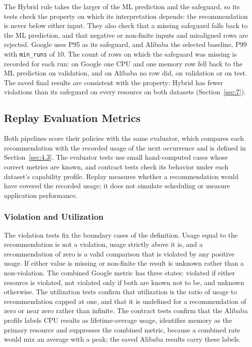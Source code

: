 \documentclass{IEEEtran}
\begin{document}
The Hybrid rule takes the larger of the ML prediction and the safeguard, so its tests check the property on which its interpretation depends: the recommendation is never below either input. They also check that a missing safeguard falls back to the ML prediction, and that negative or non-finite inputs and misaligned rows are rejected. Google uses P95 as its safeguard, and Alibaba the selected baseline, P99 with \texttt{min\_runs} of 10. The count of rows on which the safeguard was missing is recorded for each run: on Google one CPU and one memory row fell back to the ML prediction on validation, and on Alibaba no row did, on validation or on test. The saved final results are consistent with the property: Hybrid has fewer violations than its safeguard on every resource on both datasets (Section~\ref{sec:7}).

\subsection{Replay Evaluation Metrics}\label{sec:6.4}

Both pipelines score their policies with the same evaluator, which compares each recommendation with the recorded usage of the next occurrence and is defined in Section~\ref{sec:4.3}. The evaluator tests use small hand-computed cases whose correct metrics are known, and contract tests check its behavior under each dataset's capability profile. Replay measures whether a recommendation would have covered the recorded usage; it does not simulate scheduling or measure application performance.

\subsubsection{Violation and Utilization}\label{sec:6.4.1}

The violation tests fix the boundary cases of the definition. Usage equal to the recommendation is not a violation, usage strictly above it is, and a recommendation of zero is a valid comparison that is violated by any positive usage. If either value is missing or non-finite the result is unknown rather than a non-violation. The combined Google metric has three states: violated if either resource is violated, not violated only if both are known not to be, and unknown otherwise. The utilization tests confirm that utilization is the ratio of usage to recommendation capped at one, and that it is undefined for a recommendation of zero or near zero rather than infinite. The contract tests confirm that the Alibaba profile labels CPU results as lifetime-average usage, identifies memory as the primary resource and suppresses the combined metric, because a combined rate would mix an average with a peak; the saved Alibaba results carry these labels.
\end{document}
